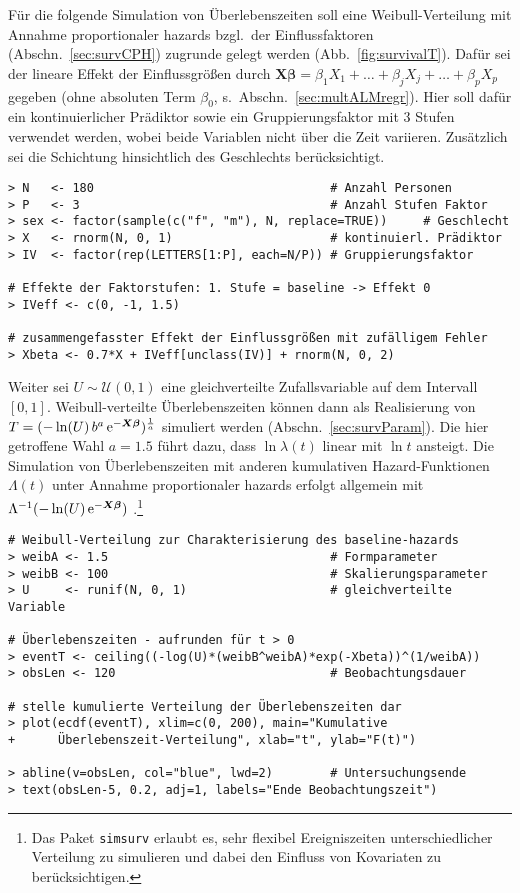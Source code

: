 Für die folgende Simulation von Überlebenszeiten soll eine Weibull-Verteilung mit Annahme proportionaler hazards bzgl.\ der Einflussfaktoren (Abschn.\ \ref{sec:survCPH}) zugrunde gelegt werden (Abb.\ \ref{fig:survivalT}). Dafür sei der lineare Effekt der Einflussgrößen durch $\bm{X} \bm{\beta} = \beta_{1} X_{1} + \dots + \beta_{j} X_{j} + \dots + \beta_{p} X_{p}$ gegeben (ohne absoluten Term $\beta_{0}$, s.\ Abschn.\ \ref{sec:multALMregr}). Hier soll dafür ein kontinuierlicher Prädiktor sowie ein Gruppierungsfaktor mit $3$ Stufen verwendet werden, wobei beide Variablen nicht über die Zeit variieren. Zusätzlich sei die Schichtung hinsichtlich des Geschlechts berücksichtigt.
\begin{lstlisting}
> N   <- 180                                 # Anzahl Personen
> P   <- 3                                   # Anzahl Stufen Faktor
> sex <- factor(sample(c("f", "m"), N, replace=TRUE))     # Geschlecht
> X   <- rnorm(N, 0, 1)                      # kontinuierl. Prädiktor
> IV  <- factor(rep(LETTERS[1:P], each=N/P)) # Gruppierungsfaktor

# Effekte der Faktorstufen: 1. Stufe = baseline -> Effekt 0
> IVeff <- c(0, -1, 1.5)

# zusammengefasster Effekt der Einflussgrößen mit zufälligem Fehler
> Xbeta <- 0.7*X + IVeff[unclass(IV)] + rnorm(N, 0, 2)
\end{lstlisting}

Weiter sei $U \sim \mathcal{U}(0, 1)$ eine gleichverteilte Zufallsvariable auf dem Intervall $[0, 1]$. Weibull-verteilte Überlebenszeiten können dann als Realisierung von $T = (-\ln(U) \, b^{a} \, {\mathrm{e}}^{-\bm{X} \bm{\beta}})^{\frac{1}{a}}$ simuliert werden (Abschn.\ \ref{sec:survParam}). Die hier getroffene Wahl $a = 1.5$ führt dazu, dass $\ln \lambda(t)$ linear mit $\ln t$ ansteigt. Die Simulation von Überlebenszeiten mit anderen kumulativen Hazard-Funktionen $\Lambda(t)$ unter Annahme proportionaler hazards erfolgt allgemein mit $\Lambda^{-1}(-\ln(U) \, {\mathrm{e}}^{-\bm{X} \bm{\beta}})$ \cite{Bender2005}.\footnote{Das Paket \lstinline!simsurv! \cite{Brilleman2021} erlaubt es, sehr flexibel Ereigniszeiten unterschiedlicher Verteilung zu simulieren und dabei den Einfluss von Kovariaten zu berücksichtigen.}
\begin{lstlisting}
# Weibull-Verteilung zur Charakterisierung des baseline-hazards
> weibA <- 1.5                               # Formparameter
> weibB <- 100                               # Skalierungsparameter
> U     <- runif(N, 0, 1)                    # gleichverteilte Variable

# Überlebenszeiten - aufrunden für t > 0
> eventT <- ceiling((-log(U)*(weibB^weibA)*exp(-Xbeta))^(1/weibA))
> obsLen <- 120                              # Beobachtungsdauer

# stelle kumulierte Verteilung der Überlebenszeiten dar
> plot(ecdf(eventT), xlim=c(0, 200), main="Kumulative
+      Überlebenszeit-Verteilung", xlab="t", ylab="F(t)")

> abline(v=obsLen, col="blue", lwd=2)        # Untersuchungsende
> text(obsLen-5, 0.2, adj=1, labels="Ende Beobachtungszeit")
\end{lstlisting}

